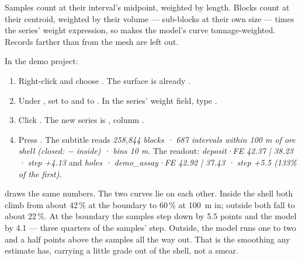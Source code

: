 Samples count at their interval's midpoint, weighted by length. Blocks count at their centroid, weighted by their volume — sub-blocks at their own size — times the series' weight expression, so  makes the model's curve tonnage-weighted. Records farther than  from the mesh are left out.

\begin{tryit}
In the demo project:
\begin{enumerate}
\item Right-click  and choose . The surface is already .
\item Under , set  to  and  to . In the series' weight field, type .
\item Click . The new series is , column .
\item Press . The subtitle reads \emph{258,844 blocks · 687 intervals within 100 m of ore shell (closed: − inside) · bins 10 m}. The readout: \emph{deposit·FE 42.37 | 38.23 · step +4.13} and \emph{holes · demo\_assay·FE 42.92 | 37.43 · step +5.5 (133\% of the first)}.
\end{enumerate}
\end{tryit}


 draws the same numbers. The two curves lie on each other. Inside the shell both climb from about 42\,\% at the boundary to 60\,\% at 100~m in; outside both fall to about 22\,\%. At the boundary the samples step down by 5.5 points and the model by 4.1 — three quarters of the samples' step. Outside, the model runs one to two and a half points above the samples all the way out. That is the smoothing any estimate has, carrying a little grade out of the shell, not a smear.

